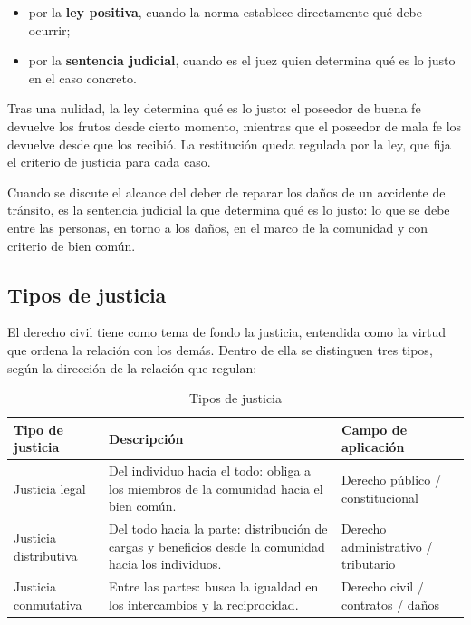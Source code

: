 \documentclass[12pt,oneside]{book}
\begin{document}
\begin{itemize}
\item por la \textbf{ley positiva}, cuando la norma establece directamente qué debe ocurrir;
\item por la \textbf{sentencia judicial}, cuando es el juez quien determina qué es lo justo en el caso concreto.
\end{itemize}

\begin{ejemplo}
Tras una nulidad, la ley determina qué es lo justo: el poseedor de buena fe devuelve los frutos desde cierto momento, mientras que el poseedor de mala fe los devuelve desde que los recibió. La restitución queda regulada por la ley, que fija el criterio de justicia para cada caso.
\end{ejemplo}

\begin{ejemplo}
Cuando se discute el alcance del deber de reparar los daños de un accidente de tránsito, es la sentencia judicial la que determina qué es lo justo: lo que se debe entre las personas, en torno a los daños, en el marco de la comunidad y con criterio de bien común.
\end{ejemplo}

\subsection{Tipos de justicia}

El derecho civil tiene como tema de fondo la justicia, entendida como la virtud que ordena la relación con los demás. Dentro de ella se distinguen tres tipos, según la dirección de la relación que regulan:

\begin{table}[H]
\centering
\begin{tabularx}{\textwidth}{B{0.22\textwidth} Y B{0.24\textwidth}}
\toprule
\textbf{Tipo de justicia} & \textbf{Descripción} & \textbf{Campo de aplicación} \\
\midrule
Justicia legal & Del individuo hacia el todo: obliga a los miembros de la comunidad hacia el bien común. & Derecho público / constitucional \\
Justicia distributiva & Del todo hacia la parte: distribución de cargas y beneficios desde la comunidad hacia los individuos. & Derecho administrativo / tributario \\
Justicia conmutativa & Entre las partes: busca la igualdad en los intercambios y la reciprocidad. & Derecho civil / contratos / daños \\
\bottomrule
\end{tabularx}
\caption{Tipos de justicia}
\end{table}
\end{document}
